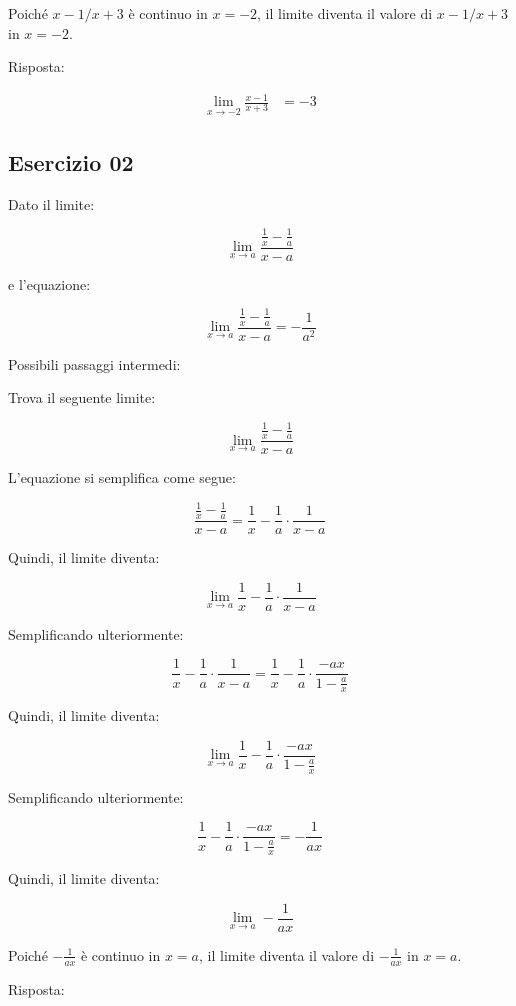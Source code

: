 \documentclass{book}
\begin{document}
Poiché \(x - 1/x + 3\) è continuo in \(x = -2\), il limite diventa il valore di \(x - 1/x + 3\) in \(x = -2\).

Risposta:

\[
    \begin{aligned}
        \lim_{{x \to -2}} \frac{{x - 1}}{{x + 3}} & = -3
    \end{aligned}
\]
\subsection{Esercizio 02}

Dato il limite:

\[
    \lim_{{x \to a}} \frac{{\frac{1}{x} - \frac{1}{a}}}{{x - a}}
\]

e l'equazione:

\[
    \lim_{{x \to a}} \frac{{\frac{1}{x} - \frac{1}{a}}}{{x - a}} = -\frac{1}{a^2}
\]

Possibili passaggi intermedi:

Trova il seguente limite:

\[
    \lim_{{x \to a}} \frac{\frac{1}{x} - \frac{1}{a}}{x - a}
\]

L'equazione si semplifica come segue:

\[
    \frac{\frac{1}{x} - \frac{1}{a}}{x - a} = \frac{1}{x} - \frac{1}{a} \cdot \frac{1}{x - a}
\]

Quindi, il limite diventa:

\[
    \lim_{{x \to a}} \frac{1}{x} - \frac{1}{a} \cdot \frac{1}{x - a}
\]

Semplificando ulteriormente:

\[
    \frac{1}{x} - \frac{1}{a} \cdot \frac{1}{x - a} = \frac{1}{x} - \frac{1}{a} \cdot \frac{-a x}{1 - \frac{a}{x}}
\]

Quindi, il limite diventa:

\[
    \lim_{{x \to a}} \frac{1}{x} - \frac{1}{a} \cdot \frac{-a x}{1 - \frac{a}{x}}
\]

Semplificando ulteriormente:

\[
    \frac{1}{x} - \frac{1}{a} \cdot \frac{-a x}{1 - \frac{a}{x}} = -\frac{1}{a x}
\]

Quindi, il limite diventa:

\[
    \lim_{{x \to a}} -\frac{1}{a x}
\]

Poiché \(-\frac{1}{a x}\) è continuo in \(x = a\), il limite diventa il valore di \(-\frac{1}{a x}\) in \(x = a\).

Risposta:
\end{document}
